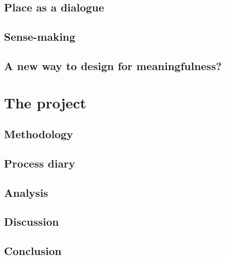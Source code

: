 \documentclass[UKenglish]{ifimaster}
\begin{document}
\chapter{Place as a dialogue}


\chapter{Sense-making}

\chapter{A new way to design for meaningfulness?}


\part{The project}
\chapter{Methodology}

\chapter{Process diary}


\chapter{Analysis}


\chapter{Discussion}


\chapter{Conclusion}


\backmatter{}
\printbibliography



% 
\end{document}
